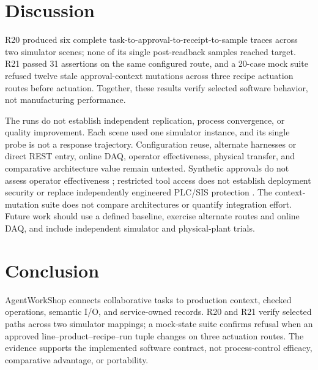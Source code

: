 \section{Discussion}
\label{sec:limits}
R20 produced six complete task-to-approval-to-receipt-to-sample traces across
two simulator scenes; none of its single post-readback samples reached target.
R21 passed 31 assertions on the same configured route, and a 20-case mock
suite refused twelve stale approval-context mutations across three recipe
actuation routes before actuation.
Together, these results verify selected software behavior, not manufacturing
performance.

The runs do not establish independent replication, process convergence, or
quality improvement. Each scene used one simulator instance, and its single
probe is not a response trajectory. Configuration reuse, alternate harnesses
or direct REST entry, online DAQ, operator effectiveness, physical transfer,
and comparative architecture value remain untested. Synthetic approvals do
not assess operator effectiveness
\cite{parasuramanmanzey2010complacency,parasuraman2000model,bainbridge1983ironies};
restricted tool access does not establish deployment security
\cite{greshake2023injection,liu2024pinjection,iec62443-3-3} or replace
independently engineered PLC/SIS protection \cite{iec61511}. The
context-mutation suite does not compare architectures or quantify integration
effort. Future work should use a defined baseline, exercise alternate routes
and online DAQ, and include independent simulator and physical-plant trials.

\section{Conclusion}
\label{sec:conclusion}
AgentWorkShop connects collaborative tasks to production context, checked
operations, semantic I/O, and service-owned records. R20 and R21 verify
selected paths across two simulator mappings; a mock-state suite confirms
refusal when an approved line--product--recipe--run tuple changes on three
actuation routes. The evidence supports the implemented software contract,
not process-control efficacy, comparative advantage, or portability.
